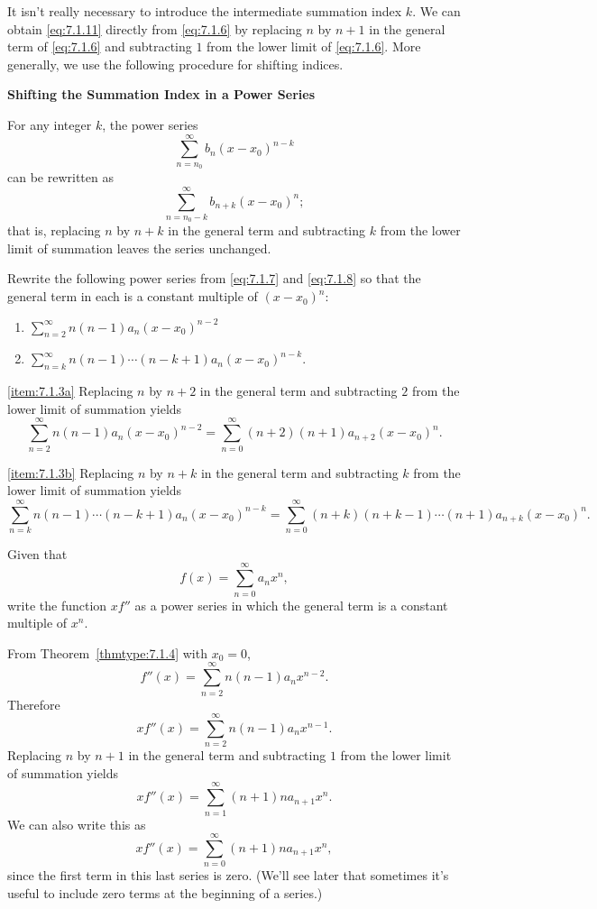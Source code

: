 \documentclass{ximera}
\begin{document}
It isn't  really necessary to introduce the intermediate summation
index $k$. We can obtain \eqref{eq:7.1.11} directly from \eqref{eq:7.1.6}
by replacing $n$ by $n+1$ in the general term of \eqref{eq:7.1.6} and
subtracting $1$ from the lower limit of \eqref{eq:7.1.6}. More generally,
we use the following procedure for shifting indices.

\begin{procedure}
{\bf Shifting the Summation Index in a Power
Series}

For any integer $k$,  the power series
$$
\sum_{n=n_0}^\infty b_n(x-x_0)^{n-k}
$$
can be rewritten  as
$$
\sum_{n=n_0-k}^\infty b_{n+k}(x-x_0)^n;
$$
that is, replacing $n$ by $n+k$ in the general term and subtracting
$k$ from the lower limit of summation leaves the series unchanged.
\end{procedure}

\begin{example}\label{example:7.1.3}
Rewrite the following power series from \eqref{eq:7.1.7}  and \eqref{eq:7.1.8}
so that the general term in each  is a  constant multiple of
$(x-x_0)^n$:
\begin{enumerate}
    \item \label{item:7.1.3a}
$\sum_{n=2}^\infty
n(n-1)a_n(x-x_0)^{n-2}$
\item \label{item:7.1.3b}
$\sum_{n=k}^\infty
n(n-1)\cdots(n-k+1)a_n(x-x_0)^{n-k}.
$
\end{enumerate}

\begin{explanation}
\ref{item:7.1.3a} Replacing $n$ by $n+2$ in the general term
and subtracting $2$ from the lower limit of summation yields
$$
\sum_{n=2}^\infty n(n-1)a_n(x-x_0)^{n-2}=
\sum_{n=0}^\infty (n+2)(n+1)a_{n+2}(x-x_0)^n.
$$

\ref{item:7.1.3b}  Replacing $n$ by $n+k$ in the general term
and subtracting $k$ from the lower limit of summation yields
$$
\sum_{n=k}^\infty
n(n-1)\cdots(n-k+1)a_n(x-x_0)^{n-k}=
\sum_{n=0}^\infty (n+k)(n+k-1)\cdots(n+1)a_{n+k}(x-x_0)^n.
$$
\end{explanation}
\end{example}

\begin{example}\label{example:7.1.4}
Given that
$$
f(x)=\sum_{n=0}^\infty a_nx^n,
$$
write the function $xf''$  as a power series in which the general term
is a  constant multiple of $x^n$.

\begin{explanation}
From Theorem~\ref{thmtype:7.1.4} with $x_0=0$,
$$
f''(x)=\sum_{n=2}^\infty n(n-1)a_nx^{n-2}.
$$
Therefore
$$
xf''(x)=\sum_{n=2}^\infty n(n-1)a_nx^{n-1}.
$$
Replacing $n$ by $n+1$ in the general term and  subtracting $1$
from the lower limit of summation yields
$$
xf''(x)=\sum_{n=1}^\infty (n+1)na_{n+1}x^n.
$$
We can also write this as
$$
xf''(x)=\sum_{n=0}^\infty (n+1)na_{n+1}x^n,
$$
since the first term in this last series is zero.  (We'll see
later that  sometimes it's useful to include zero terms at the
beginning of a series.)

\end{explanation}
\end{example}
\end{document}
